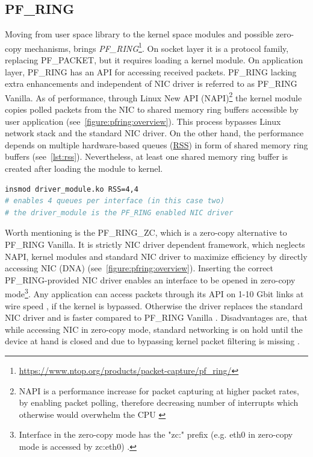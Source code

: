 \documentclass[12pt,a4paper,twoside]{report}
\begin{document}
		\subsection{PF\_RING} \label{analysis:mechs:pfring}
			Moving from user space library to the kernel space modules and possible zero-copy mechanisms, brings \emph{PF\_RING}\footnote{\url{https://www.ntop.org/products/packet-capture/pf_ring/}}. On socket layer it is a protocol family, replacing PF\_PACKET, but it requires loading a kernel module. On application layer, PF\_RING has an API for accessing received packets. PF\_RING lacking extra enhancements and independent of NIC driver is referred to as PF\_RING Vanilla. As of performance, through Linux New API (NAPI)\footnote{NAPI is a performance increase for packet capturing at higher packet rates, by enabling packet polling, therefore decreasing number of interrupts which otherwise would overwhelm the CPU \cite{web:linux:napi}} the kernel module copies polled packets from the NIC to shared memory ring buffers accessible by user application (see~\autoref{figure:pfring:overview})\cite{web:pfring:vanilla}. This process bypasses Linux network stack and the standard NIC driver. On the other hand, the performance depends on multiple hardware-based queues (\hyperref[analysis:mechs:scapy_rss]{RSS}) in form of shared memory ring buffers (see~\autoref{lst:rss}). Nevertheless, at least one shared memory ring buffer is created after loading the module to kernel. \cite{docs:pfring:vanilla}
			\begin{lstlisting}[language=bash, caption=Enabling RSS \cite{docs:pfring:rss}., label=lst:rss]
insmod driver_module.ko RSS=4,4
# enables 4 queues per interface (in this case two)
# the driver_module is the PF_RING enabled NIC driver
			\end{lstlisting}
			\par
			Worth mentioning is the PF\_RING\_ZC, which is a zero-copy alternative to PF\_RING Vanilla. It is strictly NIC driver dependent framework, which neglects NAPI, kernel modules and standard NIC driver to maximize efficiency by directly accessing NIC (DNA) (see~\autoref{figure:pfring:overview}). Inserting the correct PF\_RING-provided NIC driver enables an interface to be opened in zero-copy mode\footnote{Interface in the zero-copy mode has the "zc:" prefix (e.g. eth0 in zero-copy mode is accessed by zc:eth0) \cite{docs:pfring:zero}.}. Any application can access packets through its API on 1-10 Gbit links at wire speed \cite{docs:pfring:zero}, if the kernel is bypassed. Otherwise the driver replaces the standard NIC driver and is faster compared to PF\_RING Vanilla \cite{web:pfring:zero}. Disadvantages are, that while accessing NIC in zero-copy mode, standard networking is on hold until the device at hand is closed \cite{web:pfring:zero} and due to bypassing kernel packet filtering is missing \cite{docs:pfring:zero}.\par
\end{document}
